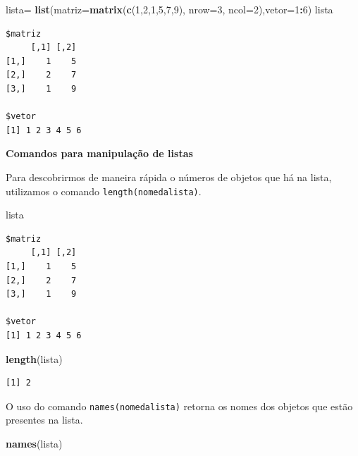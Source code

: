 \documentclass[12pt,brazil,oneside]{book}
\newenvironment{Shaded}{\begin{snugshade}}{\end{snugshade}}
\newcommand{\DataTypeTok}[1]{\textcolor[rgb]{0.13,0.29,0.53}{#1}}
\newcommand{\DecValTok}[1]{\textcolor[rgb]{0.00,0.00,0.81}{#1}}
\newcommand{\KeywordTok}[1]{\textcolor[rgb]{0.13,0.29,0.53}{\textbf{#1}}}
\newcommand{\NormalTok}[1]{#1}
\newcommand{\OperatorTok}[1]{\textcolor[rgb]{0.81,0.36,0.00}{\textbf{#1}}}
\newcommand{\StringTok}[1]{\textcolor[rgb]{0.31,0.60,0.02}{#1}}
\begin{document}
\begin{Shaded}
\begin{Highlighting}[]
\NormalTok{lista=}\StringTok{ }\KeywordTok{list}\NormalTok{(}\DataTypeTok{matriz=}\KeywordTok{matrix}\NormalTok{(}\KeywordTok{c}\NormalTok{(}\DecValTok{1}\NormalTok{,}\DecValTok{2}\NormalTok{,}\DecValTok{1}\NormalTok{,}\DecValTok{5}\NormalTok{,}\DecValTok{7}\NormalTok{,}\DecValTok{9}\NormalTok{), }\DataTypeTok{nrow=}\DecValTok{3}\NormalTok{, }\DataTypeTok{ncol=}\DecValTok{2}\NormalTok{),}\DataTypeTok{vetor=}\DecValTok{1}\OperatorTok{:}\DecValTok{6}\NormalTok{)}
\NormalTok{lista}
\end{Highlighting}
\end{Shaded}

\begin{verbatim}
$matriz
     [,1] [,2]
[1,]    1    5
[2,]    2    7
[3,]    1    9

$vetor
[1] 1 2 3 4 5 6
\end{verbatim}

\textbf{Comandos para manipulação de listas}

Para descobrirmos de maneira rápida o números de objetos que há na lista, utilizamos o comando \texttt{length(nomedalista)}.

\begin{Shaded}
\begin{Highlighting}[]
\NormalTok{lista}
\end{Highlighting}
\end{Shaded}

\begin{verbatim}
$matriz
     [,1] [,2]
[1,]    1    5
[2,]    2    7
[3,]    1    9

$vetor
[1] 1 2 3 4 5 6
\end{verbatim}

\begin{Shaded}
\begin{Highlighting}[]
\KeywordTok{length}\NormalTok{(lista)}
\end{Highlighting}
\end{Shaded}

\begin{verbatim}
[1] 2
\end{verbatim}

O uso do comando \texttt{names(nomedalista)} retorna os nomes dos objetos que estão presentes na lista.

\begin{Shaded}
\begin{Highlighting}[]
\KeywordTok{names}\NormalTok{(lista)}
\end{Highlighting}
\end{Shaded}
\end{document}
